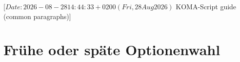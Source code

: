 %
%
%
%
%
%
%

                 [$Date: 2026-08-28 14:44:33 +0200 (Fri, 28 Aug 2026) $
                  KOMA-Script guide (common paragraphs)]

\section{Frühe oder späte Optionenwahl}
\BeginIndexGroup
{}%

